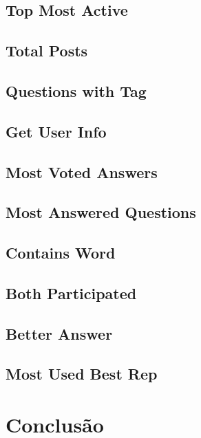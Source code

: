 \documentclass[a4paper, 11pt, oneside]{article}
\begin{document}
\subsection{Top Most Active}

\subsection{Total Posts}

\subsection{Questions with Tag}

\subsection{Get User Info}

\subsection{Most Voted Answers}

\subsection{Most Answered Questions}

\subsection{Contains Word}

\subsection{Both Participated}

\subsection{Better Answer}

\subsection{Most Used Best Rep}

\newpage
\section{Conclusão}
\end{document}
